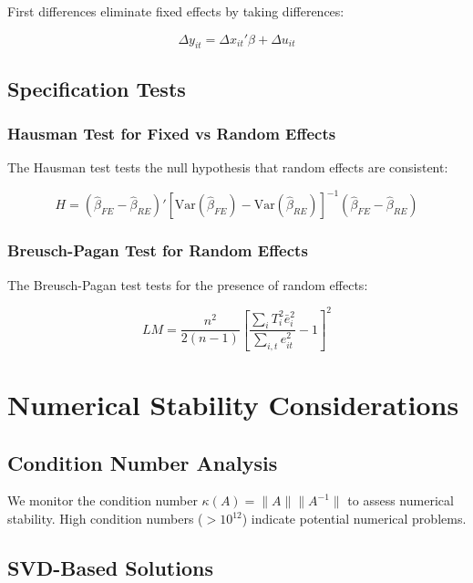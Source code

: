 \documentclass[11pt]{article}
\begin{document}
First differences eliminate fixed effects by taking differences:

\begin{equation}
\Delta y_{it} = \Delta x_{it}'\beta + \Delta u_{it}
\end{equation}

\subsection{Specification Tests}

\subsubsection{Hausman Test for Fixed vs Random Effects}

The Hausman test \citep{hausman1978} tests the null hypothesis that random effects are consistent:

\begin{equation}
H = (\hat{\beta}_{FE} - \hat{\beta}_{RE})'[\text{Var}(\hat{\beta}_{FE}) - \text{Var}(\hat{\beta}_{RE})]^{-1}(\hat{\beta}_{FE} - \hat{\beta}_{RE})
\end{equation}

\subsubsection{Breusch-Pagan Test for Random Effects}

The Breusch-Pagan test \citep{breusch1980} tests for the presence of random effects:

\begin{equation}
LM = \frac{n^2}{2(n-1)} \left[\frac{\sum_i T_i^2 \bar{e}_i^2}{\sum_{i,t} e_{it}^2} - 1\right]^2
\end{equation}

\section{Numerical Stability Considerations}

\subsection{Condition Number Analysis}

We monitor the condition number $\kappa(A) = \|A\| \|A^{-1}\|$ to assess numerical stability. High condition numbers ($> 10^{12}$) indicate potential numerical problems.

\subsection{SVD-Based Solutions}
\end{document}
